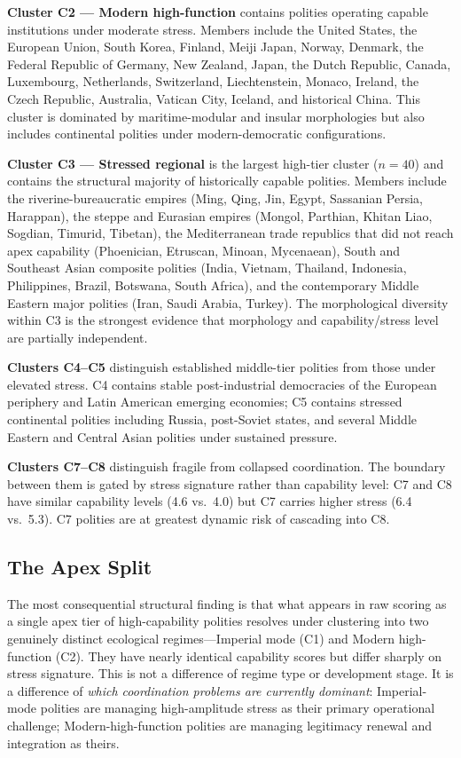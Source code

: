 \documentclass[12pt,a4paper]{article}
\begin{document}
\textbf{Cluster C2 --- Modern high-function} contains polities operating capable institutions under moderate stress. Members include the United States, the European Union, South Korea, Finland, Meiji Japan, Norway, Denmark, the Federal Republic of Germany, New Zealand, Japan, the Dutch Republic, Canada, Luxembourg, Netherlands, Switzerland, Liechtenstein, Monaco, Ireland, the Czech Republic, Australia, Vatican City, Iceland, and historical China. This cluster is dominated by maritime-modular and insular morphologies but also includes continental polities under modern-democratic configurations.

\textbf{Cluster C3 --- Stressed regional} is the largest high-tier cluster ($n = 40$) and contains the structural majority of historically capable polities. Members include the riverine-bureaucratic empires (Ming, Qing, Jin, Egypt, Sassanian Persia, Harappan), the steppe and Eurasian empires (Mongol, Parthian, Khitan Liao, Sogdian, Timurid, Tibetan), the Mediterranean trade republics that did not reach apex capability (Phoenician, Etruscan, Minoan, Mycenaean), South and Southeast Asian composite polities (India, Vietnam, Thailand, Indonesia, Philippines, Brazil, Botswana, South Africa), and the contemporary Middle Eastern major polities (Iran, Saudi Arabia, Turkey). The morphological diversity within C3 is the strongest evidence that morphology and capability/stress level are partially independent.

\textbf{Clusters C4--C5} distinguish established middle-tier polities from those under elevated stress. C4 contains stable post-industrial democracies of the European periphery and Latin American emerging economies; C5 contains stressed continental polities including Russia, post-Soviet states, and several Middle Eastern and Central Asian polities under sustained pressure.

\textbf{Clusters C7--C8} distinguish fragile from collapsed coordination. The boundary between them is gated by stress signature rather than capability level: C7 and C8 have similar capability levels (4.6 vs.\ 4.0) but C7 carries higher stress (6.4 vs.\ 5.3). C7 polities are at greatest dynamic risk of cascading into C8.

\subsection{The Apex Split}

The most consequential structural finding is that what appears in raw scoring as a single apex tier of high-capability polities resolves under clustering into two genuinely distinct ecological regimes---Imperial mode (C1) and Modern high-function (C2). They have nearly identical capability scores but differ sharply on stress signature. This is not a difference of regime type or development stage. It is a difference of \textit{which coordination problems are currently dominant}: Imperial-mode polities are managing high-amplitude stress as their primary operational challenge; Modern-high-function polities are managing legitimacy renewal and integration as theirs.
\end{document}
